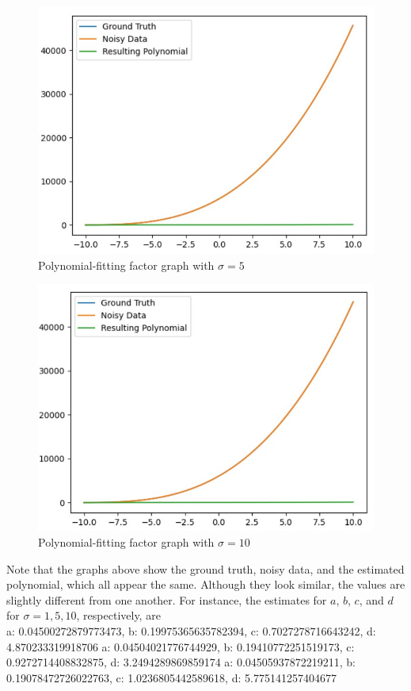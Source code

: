 \documentclass{article}
\begin{document}
\begin{figure} [H]
    \centering
    \includegraphics[width=0.8\linewidth]{latex_media/polynomial_factor_graph_sigma5.jpg}
    \caption{Polynomial-fitting factor graph with $\sigma = 5$}
\end{figure}

\begin{figure} [H]
    \centering
    \includegraphics[width=0.8\linewidth]{latex_media/polynomial_factor_graph_sigma10.jpg}
    \caption{Polynomial-fitting factor graph with $\sigma = 10$}
\end{figure}

Note that the graphs above show the ground truth, noisy data, and the estimated polynomial, which all appear the same. Although they look similar, the values are slightly different from one another. For instance, the estimates for $a$, $b$, $c$, and $d$ for $\sigma = 1,5,10$, respectively, are \\

\noindent
a: 0.04500272879773473, b: 0.19975365635782394, c: 0.7027278716643242, d: 4.870233319918706 \newline
a: 0.04504021776744929, b: 0.19410772251519173, c: 0.9272714408832875, d: 3.2494289869859174 \newline
a: 0.04505937872219211, b: 0.19078472726022763, c: 1.0236805442589618, d: 5.775141257404677 \newline
\end{document}
